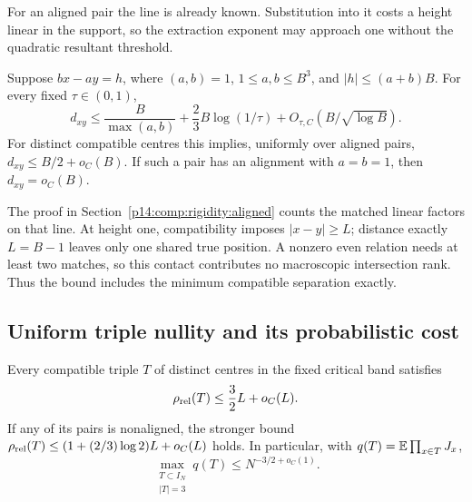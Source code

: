 For an aligned pair the line is already known.  Substitution into it
costs a height linear in the support, so the extraction exponent may
approach one without the quadratic resultant threshold.

\begin{proposition}
\label{p13:rig:aligned}
Suppose $bx-ay=h$, where $(a,b)=1$, $1\le a,b\le B^3$,
and $|h|\le(a+b)B$.  For every fixed $\tau\in(0,1)$,
\begin{equation}
 d_{xy}\le\frac B{\max(a,b)}+\frac23B\log(1/\tau)
                    +O_{\tau,C}(B/\sqrt{\log B}).
 \label{p13:rig:aligned-quantitative}
\end{equation}
For distinct compatible centres this implies, uniformly
over aligned pairs,
$d_{xy}\le B/2+o_C(B)$.  If such a pair has an alignment
with $a=b=1$, then $d_{xy}=o_C(B)$.
\end{proposition}

The proof in Section~\ref{p14:comp:rigidity:aligned} counts the matched
linear factors on that line.  At height one, compatibility imposes
$|x-y|\ge L$; distance exactly $L=B-1$ leaves only one shared true
position.  A nonzero even relation needs at least two matches, so this
contact contributes no macroscopic intersection rank.  Thus the bound
includes the minimum compatible separation exactly.

\subsection{Uniform triple nullity and its probabilistic cost}

\begin{corollary}
\label{p13:rig:triple}
Every compatible triple $T$ of distinct centres in the
fixed critical band satisfies
\begin{equation}
                 \rho_{\rm rel}(T)\le\frac32L+o_C(L).
 \label{p13:rig:triple-nullity}
\end{equation}
If any of its pairs is nonaligned, the stronger bound
$\rho_{\rm rel}(T)\le(1+(2/3)\log2)L+o_C(L)$ holds.
In particular, with $q(T)=\mathbb E\prod_{x\in T}J_x$,
\begin{equation}
                  \max_{\substack{T\subset I_N\\|T|=3}}q(T)
                            \le N^{-3/2+o_C(1)}.
 \label{p13:rig:max-triple}
\end{equation}
\end{corollary}


